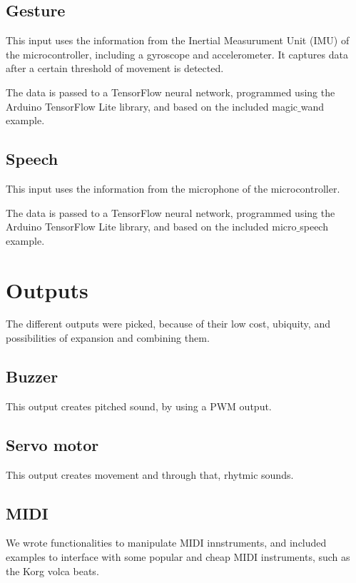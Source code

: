 \subsection{Gesture}

This input uses the information from the Inertial Measurument Unit (IMU) of the microcontroller, including a gyroscope and accelerometer. It captures data after a certain threshold of movement is detected. 

The data is passed to a TensorFlow neural network, programmed using the Arduino TensorFlow Lite library, and based on the included magic$\_$wand example.

\subsection{Speech}

This input uses the information from the microphone of the microcontroller.

The data is passed to a TensorFlow neural network, programmed using the Arduino TensorFlow Lite library, and based on the included micro$\_$speech example.

\section{Outputs}

The different outputs were picked, because of their low cost, ubiquity, and possibilities of expansion and combining them.

\subsection{Buzzer}

This output creates pitched sound, by using a PWM output.

\subsection{Servo motor}

This output creates movement and through that, rhytmic sounds.

\subsection{MIDI}

We wrote functionalities to manipulate MIDI innstruments, and included examples to interface with some popular and cheap MIDI instruments, such as the Korg volca beats.

